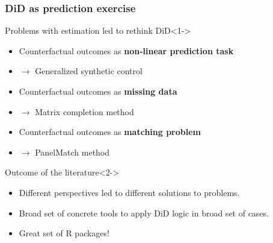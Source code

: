 \documentclass[12pt,aspectratio=169]{beamer}\usepackage[]{graphicx}\usepackage[]{xcolor}
\begin{document}
\begin{frame}
\frametitle{DiD as prediction exercise}

    \begin{alertblock}{Problems with estimation led to rethink DiD}<1->

    \begin{itemize}[itemsep=0em, topsep=0pt]
    \small
        \item Counterfactual outcomes as \textbf{non-linear prediction task}
        \item $\rightarrow$ Generalized synthetic control
        \item Counterfactual outcomes as \textbf{missing data}
        \item $\rightarrow$ Matrix completion method
        \item Counterfactual outcomes as \textbf{matching problem}
        \item $\rightarrow$ PanelMatch method
    \end{itemize}

    \end{alertblock}

    \begin{alertblock}{Outcome of the literature}<2->

    \begin{itemize}[itemsep=0em, topsep=0pt]
    \small
        \item Different perspectives led to different solutions to problems.
        \item Broad set of concrete tools to apply DiD logic in broad set of cases.
        \item Great set of R packages!
    \end{itemize}

    \end{alertblock}

\end{frame}
\end{document}
